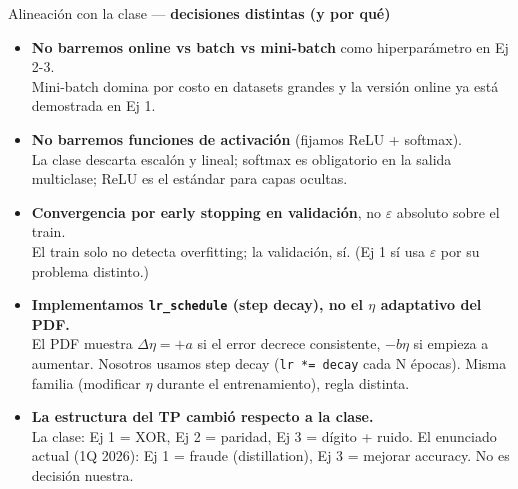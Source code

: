 \documentclass[11pt,aspectratio=169]{beamer}
\newcommand{\code}[1]{\texttt{\textcolor{accent}{#1}}}
\begin{document}
\begin{frame}{Alineación con la clase — \textbf{decisiones distintas (y por qué)}}
\small
\begin{itemize}\setlength\itemsep{0.4em}
  \item \textbf{No barremos online vs batch vs mini-batch} como hiperparámetro en Ej 2-3.\\
  \textcolor{muted}{Mini-batch domina por costo en datasets grandes y la versión online ya está demostrada en Ej 1.}
  \item \textbf{No barremos funciones de activación} (fijamos ReLU + softmax).\\
  \textcolor{muted}{La clase descarta escalón y lineal; softmax es obligatorio en la salida multiclase; ReLU es el estándar para capas ocultas.}
  \item \textbf{Convergencia por early stopping en validación}, no $\varepsilon$ absoluto sobre el train.\\
  \textcolor{muted}{El train solo no detecta overfitting; la validación, sí. (Ej 1 sí usa $\varepsilon$ por su problema distinto.)}
  \item \textbf{Implementamos \code{lr\_schedule} (step decay), no el $\eta$ adaptativo del PDF.}\\
  \textcolor{muted}{El PDF muestra $\Delta\eta = +a$ si el error decrece consistente, $-b\eta$ si empieza a aumentar. Nosotros usamos step decay (\code{lr *= decay} cada N épocas). Misma familia (modificar $\eta$ durante el entrenamiento), regla distinta.}
  \item \textbf{La estructura del TP cambió respecto a la clase.}\\
  \textcolor{muted}{La clase: Ej 1 = XOR, Ej 2 = paridad, Ej 3 = dígito + ruido. El enunciado actual (1Q 2026): Ej 1 = fraude (distillation), Ej 3 = mejorar accuracy. No es decisión nuestra.}
\end{itemize}
\end{frame}
\end{document}
